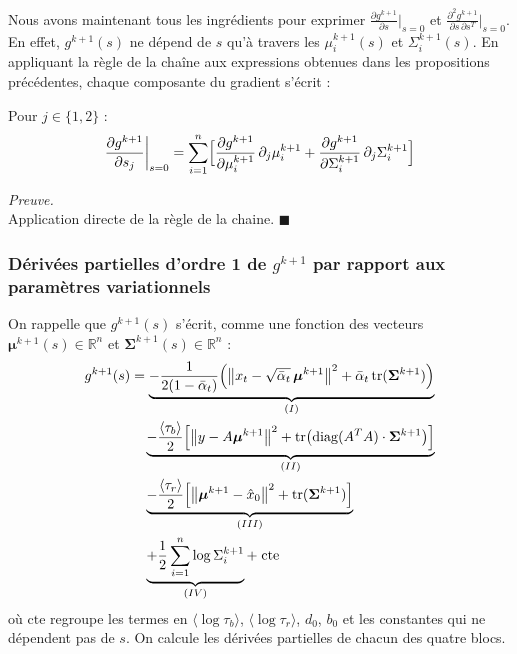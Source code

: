 \documentclass[12pt]{article}
\newcommand{\alt}{\bar\alpha_t}
\renewcommand{\qedsymbol}{$\blacksquare$}
\renewenvironment{proof}[1][\proofname]{%
  \par\medskip\noindent
  \textit{\color{proofgray}#1.}\enspace\ignorespaces
}{\hfill\qedsymbol\par\medskip}
\renewcommand{\proofname}{Preuve}
\begin{document}
Nous avons maintenant tous les ingrédients pour exprimer $\frac{\partial g^{k+1}}{\partial s}\big|_{s=0}$ et $\frac{\partial^2 g^{k+1}}{\partial s\,\partial s^T}\big|_{s=0}$. En effet, $g^{k+1}(s)$ ne dépend de $s$ qu'à travers les $\mu_i^{k+1}(s)$ et $\Sigma_i^{k+1}(s)$. En appliquant la règle de la chaîne aux expressions obtenues dans les propositions précédentes, chaque composante du gradient s'écrit :

\begin{propositionbox}[Gradient de $g^{k+1}$]
Pour $j \in \{1,2\}$ :
\begin{equation}
\frac{\partial g^{k+1}}{\partial s_j}\bigg|_{s=0} = \sum_{i=1}^n \Bigl[ \frac{\partial g^{k+1}}{\partial \mu_i^{k+1}}\,\partial_j\mu_i^{k+1} + \frac{\partial g^{k+1}}{\partial \Sigma_i^{k+1}}\,\partial_j\Sigma_i^{k+1} \Bigr]
\label{eq:grad_g}
\end{equation}
\end{propositionbox}
\begin{proof}\\
Application directe de la règle de la chaine.
\end{proof}









\subsubsection*{Dérivées partielles d'ordre 1 de $g^{k+1}$ par rapport aux paramètres variationnels}

On rappelle que $g^{k+1}(s)$ s'écrit, comme une fonction des vecteurs $\boldsymbol{\mu}^{k+1}(s) \in \mathbb{R}^n$ et $\boldsymbol{\Sigma}^{k+1}(s) \in \mathbb{R}^n$ :
\begin{equation}
\begin{aligned}
g^{k+1}(s) &= \underbrace{-\frac{1}{2(1-\alt)}\Bigl(\left\|x_t - \sqrt{\alt}\,\boldsymbol{\mu}^{k+1}\right\|^2 + \alt\,\mathrm{tr}(\boldsymbol{\Sigma}^{k+1})\Bigr)}_{(I)}\\
&\quad \underbrace{-\frac{\langle\tau_b\rangle}{2}\Bigl[\left\|y - A\boldsymbol{\mu}^{k+1}\right\|^2 + \mathrm{tr}\bigl(\mathrm{diag}(A^TA)\cdot\boldsymbol{\Sigma}^{k+1}\bigr)\Bigr]}_{(II)}\\
&\quad \underbrace{-\frac{\langle\tau_r\rangle}{2}\Bigl[\left\|\boldsymbol{\mu}^{k+1} - \hat{x}_0\right\|^2 + \mathrm{tr}(\boldsymbol{\Sigma}^{k+1})\Bigr]}_{(III)}\\
&\quad \underbrace{+\frac{1}{2}\sum_{i=1}^n \log \Sigma_i^{k+1}}_{(IV)} + \;\mathrm{cte}
\end{aligned}
\label{eq:g_explicit}
\end{equation}
où $\mathrm{cte}$ regroupe les termes en $\langle\log\tau_b\rangle$, $\langle\log\tau_r\rangle$, $d_0$, $b_0$ et les constantes qui ne dépendent pas de $s$. On calcule les dérivées partielles de chacun des quatre blocs.
\end{document}
